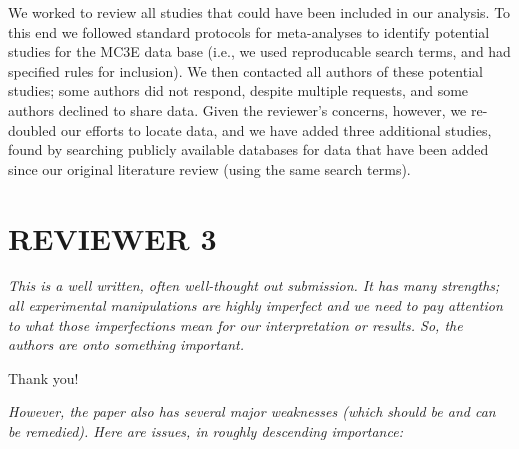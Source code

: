 \documentclass[11pt,a4paper]{letter}
\begin{document}
\begin{letter}{}
\par We worked to review all studies that could have been included in our analysis. To this end we followed standard protocols for meta-analyses to identify potential studies for the MC3E data base (i.e., we used reproducable search terms, and had specified rules for inclusion). We then contacted all authors of these potential studies; some authors did not respond, despite multiple requests, and some authors declined to share data.  Given the reviewer's concerns, however, we re-doubled our efforts to locate data, and we have added three additional studies, found by searching publicly available databases for data that have been added since our original literature review (using the same search terms). 

\section {REVIEWER 3}

\emph{This is a well written, often well-thought out submission. It has many strengths; all experimental manipulations are highly imperfect and we need to pay attention to what those imperfections mean for our interpretation or results. So, the authors are onto something important.}

\par Thank you!

\par \emph{However, the paper also has several major weaknesses (which should be and can be remedied). Here are issues, in roughly descending importance:}


\end{letter}
\end{document}
